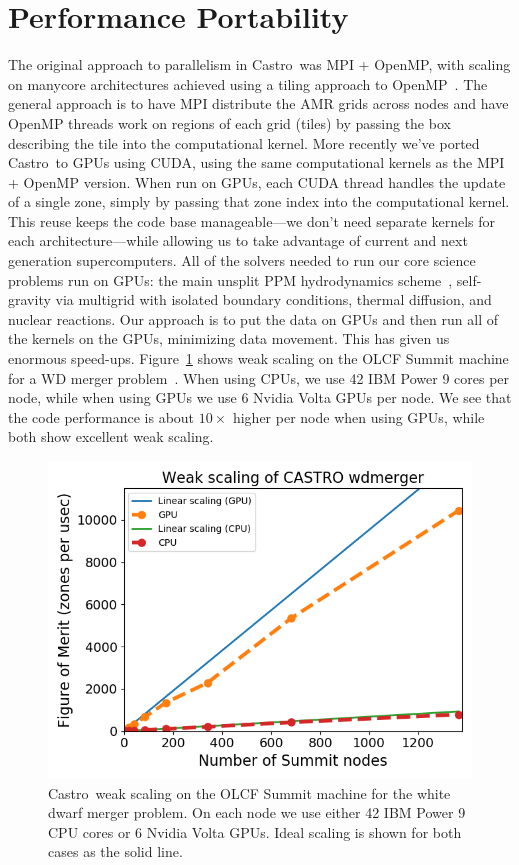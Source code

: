 \documentclass[a4paper]{jpconf}
\newcommand{\castro}{{\sffamily Castro}}
\begin{document}
\section{Performance Portability}

The original approach to parallelism in \castro\ was MPI + OpenMP,
with scaling on manycore architectures achieved using a tiling approach
to OpenMP~\cite{tiling,astronum:2017}.  The general approach is to
have MPI distribute the AMR grids across nodes and have OpenMP threads
work on regions of each grid (tiles) by passing the box describing the
tile into the computational kernel.  More recently we've ported
\castro\ to GPUs using CUDA, using the same computational kernels as
the MPI + OpenMP version.  When run on GPUs, each CUDA thread handles
the update of a single zone, simply by passing that zone index into
the computational kernel.  This reuse keeps the code base
manageable---we don't need separate kernels for each
architecture---while allowing us to take advantage of current and next
generation supercomputers.  All of the solvers needed to run our core
science problems run on GPUs: the main unsplit PPM hydrodynamics
scheme~\cite{ppm,millercolella:2002}, self-gravity via multigrid with
isolated boundary conditions, thermal diffusion, and nuclear
reactions.  Our approach is to put the data on GPUs and then run all
of the kernels on the GPUs, minimizing data movement.  This has given
us enormous speed-ups.  Figure~\ref{fig:gpu} shows weak scaling on the
OLCF Summit machine for a WD merger problem~\cite{wdmergerI}.  When
using CPUs, we use 42 IBM Power 9 cores per node, while when using
GPUs we use 6 Nvidia Volta GPUs per node.  We see that the code
performance is about $10\times$ higher per node when using GPUs, while
both show excellent weak scaling.

\begin{figure}[t]
\centering
\includegraphics[width=0.8\linewidth]{wdmerger_gpu}
\caption{\label{fig:gpu} \castro\ weak scaling on the OLCF Summit
  machine for the white dwarf merger problem.  On each node we use
  either 42 IBM Power 9 CPU cores or 6 Nvidia Volta GPUs.  Ideal
  scaling is shown for both cases as the solid line.}
\end{figure}
\end{document}

